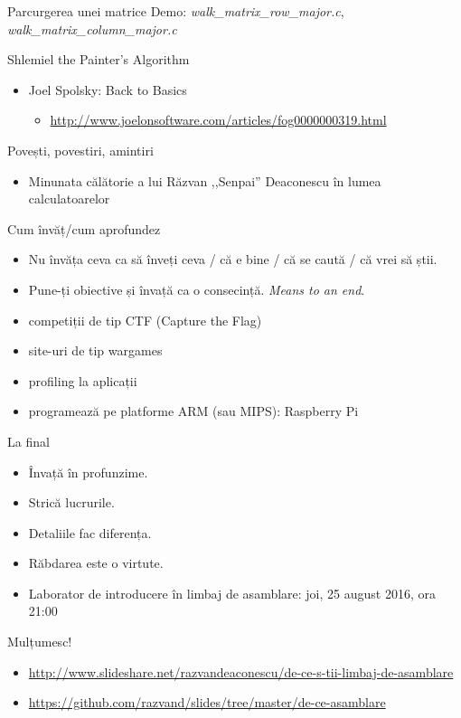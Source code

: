 \documentclass{beamer}
\begin{document}
\begin{frame}{Parcurgerea unei matrice}
  \centering
  Demo: \textit{walk\_matrix\_row\_major.c}, \textit{walk\_matrix\_column\_major.c}
\end{frame}

\begin{frame}{Shlemiel the Painter's Algorithm}
  \begin{itemize}
    \item Joel Spolsky: Back to Basics
      \begin{itemize}
        \item \footnotesize{\url{http://www.joelonsoftware.com/articles/fog0000000319.html}}
      \end{itemize}
  \end{itemize}
\end{frame}

\begin{frame}{Povești, povestiri, amintiri}
  \begin{itemize}
    \item Minunata călătorie a lui Răzvan ,,Senpai'' Deaconescu în lumea calculatoarelor
  \end{itemize}
\end{frame}

\begin{frame}{Cum învăț/cum aprofundez}
  \begin{itemize}
    \pause \item Nu învăța ceva ca să înveți ceva / că e bine / că se caută / că vrei să știi.
    \pause \item Pune-ți obiective și învață ca o consecință. \textit{Means to an end}.
    \pause \item competiții de tip CTF (Capture the Flag)
    \pause \item site-uri de tip wargames
    \pause \item profiling la aplicații
    \pause \item programează pe platforme ARM (sau MIPS): Raspberry Pi
  \end{itemize}
\end{frame}

\begin{frame}{La final}
  \begin{itemize}
    \pause \item Învață în profunzime.
    \pause \item Strică lucrurile.
    \pause \item Detaliile fac diferența.
    \pause \item Răbdarea este o virtute.
    \pause \item Laborator de introducere în limbaj de asamblare: joi, 25 august 2016, ora 21:00
  \end{itemize}
\end{frame}

\begin{frame}{Mulțumesc!}
  \begin{itemize}
    \item \tiny{\url{http://www.slideshare.net/razvandeaconescu/de-ce-s-tii-limbaj-de-asamblare}}
    \item \tiny{\url{https://github.com/razvand/slides/tree/master/de-ce-asamblare}}
  \end{itemize}
\end{frame}
\end{document}
